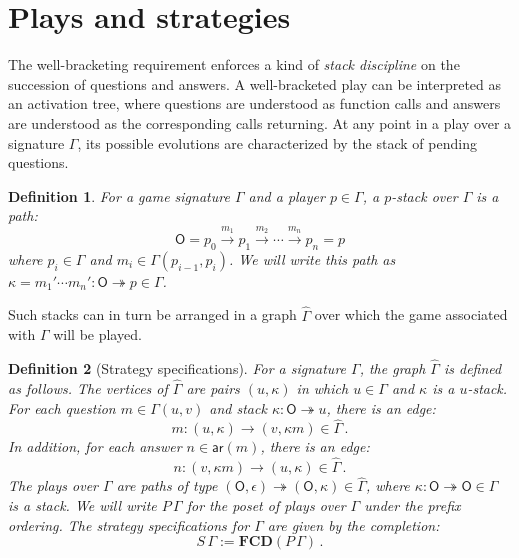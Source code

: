\documentclass[draft,11pt]{report}
\newtheorem{definition}{Definition}
\newcommand{\kw}[1]{\ensuremath{ \mathsf{#1} }}
\begin{document}


\section{Plays and strategies} %

The well-bracketing requirement
enforces a kind of \emph{stack discipline}
on the succession of questions and answers.
A well-bracketed play
can be interpreted as an activation tree,
where questions are understood as function calls
and answers are understood as the
corresponding calls returning.
At any point in a play over a signature $\Gamma$,
its possible evolutions
are characterized by the stack of pending questions.

\begin{definition}
For a game signature $\Gamma$ and a player $p \in \Gamma$,
a \emph{$p$-stack} over $\Gamma$ is a path:
\[
  \kw{O} = p_0 \xrightarrow{m_1} p_1 \xrightarrow{m_2} \cdots
             \xrightarrow{m_n} p_n = p
\]
where $p_i \in \Gamma$ and $m_i \in \Gamma(p_{i-1}, p_i)$.
We will write this path as
$\kappa = m_1' \cdots m_n' : \kw{O} \twoheadrightarrow p 
 \in \Gamma$.
\end{definition}

Such stacks can in turn be arranged in a graph $\hat{\Gamma}$
over which the game associated with $\Gamma$ will be played.

\begin{definition}[Strategy specifications] %
For a signature $\Gamma$,
the graph $\hat{\Gamma}$ is defined as follows.
The vertices of $\hat{\Gamma}$ are pairs $(u, \kappa)$
in which $u \in \Gamma$ and $\kappa$ is a $u$-stack.
For each question $m \in \Gamma(u,v)$
and stack $\kappa : \kw{O} \twoheadrightarrow u$,
there is an edge:
\[
    m : (u, \kappa) \rightarrow (v, \kappa m) \in \hat{\Gamma} \,.
\]
In addition, for each answer $n \in \kw{ar}(m)$,
there is an edge:
\[
    n : (v, \kappa m) \rightarrow (u, \kappa) \in \hat{\Gamma} \,.
\]
The \emph{plays} over $\Gamma$
are paths of type
$(\kw{O}, \epsilon) \twoheadrightarrow (\kw{O}, \kappa)
 \in \hat{\Gamma}$,
where $\kappa : \kw{O} \twoheadrightarrow \kw{O} \in \Gamma$
is a stack.
We will write
$P \, \Gamma$
for the poset of plays over $\Gamma$
under the prefix ordering.
The \emph{strategy specifications} for $\Gamma$
are given by the completion:
\[
    S \, \Gamma := \mathbf{FCD}(P \, \Gamma) \,.
\]
\end{definition}
\end{document}
